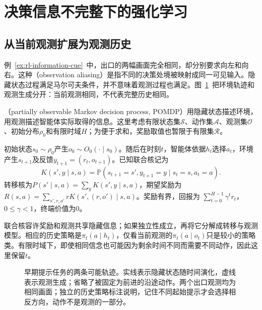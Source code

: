 \section{决策信息不完整下的强化学习}
\label{sec:rl-information-partial-observation}

\subsection{从当前观测扩展为观测历史}
\label{sec:rl-information-history-policy}

例~\ref{ex:rl-information-cue}~中，出口的两幅画面完全相同，却分别要求向左和向右。这种（observation aliasing）是指不同的决策处境被映射成同一可见输入。隐藏状态过程满足马尔可夫条件，并不意味着观测过程也满足。图~\ref{fig:rl-information-aliasing}~把环境轨迹和观测生成分开：当前观测相同，不代表完整历史相同。

\begin{definition}[有限部分可观测马尔可夫决策过程]
  \label{def:rl-information-pomdp}
  （partially observable Markov decision process, POMDP）用隐藏状态描述环境，用观测描述智能体实际取得的信息。这里考虑有限状态集$\mathcal S$、动作集$\mathcal A$、观测集$\mathcal O$、初始分布$\rho_0$和有限时域$H$；为便于求和，奖励取值也暂限于有限集$\mathcal R$。

  初始状态$s_0\sim\rho_0$产生$o_0\sim O_0(\cdot\mid s_0)$。随后在时刻$t$，智能体依据$h_t$选择$a_t$，环境产生$s_{t+1}$及反馈$y_{t+1}=(r_t,o_{t+1})$。已知联合核记为
  \[
    K(s',y\mid s,a)
    =\mathbb P(s_{t+1}=s',y_{t+1}=y\mid s_t=s,a_t=a).
  \]
  转移核为$P(s'\mid s,a)=\sum_yK(s',y\mid s,a)$，期望奖励为
  $R(s,a)=\sum_{s',r,o'}rK(s',(r,o')\mid s,a)$。奖励有界，回报为
  $\sum_{t=0}^{H-1}\gamma^t r_t$，$0\leq\gamma<1$，终端价值为0。
\end{definition}

联合核容许奖励和观测共享隐藏信息；如果独立性成立，再将它分解成转移与观测模型。相应的历史策略是$\pi_t(a\mid h_t)$，仅看当前观测的$\pi_t(a\mid o_t)$只是较小的策略类。有限时域下，即使相同信念也可能因为剩余时间不同而需要不同动作，因此这里保留$t$。

\begin{figure}[htbp]
  \centering
  
  \caption{早期提示任务的两条可能轨迹。实线表示隐藏状态随时间演化，虚线表示观测生成；省略了被固定为前进的沿途动作。两个出口观测均为相同画面；独立的历史策略标注说明，记住不同起始提示才会选择相反方向，动作不是观测的一部分。}
  \label{fig:rl-information-aliasing}
\end{figure}


